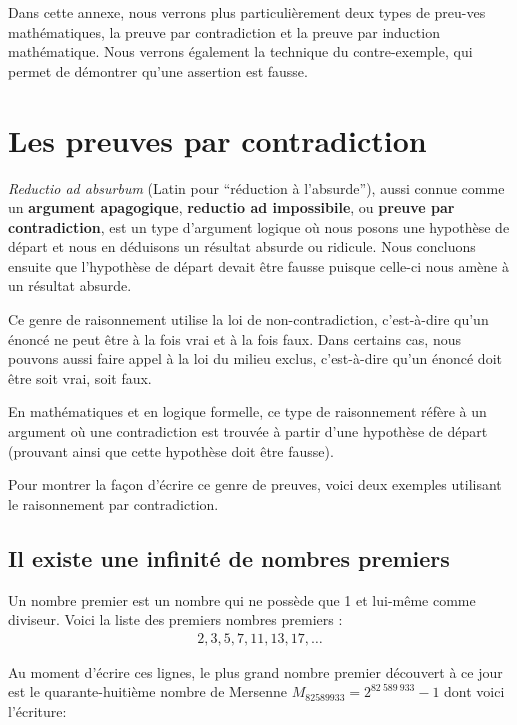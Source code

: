 \documentclass[]{book}
\theoremstyle{definition}
\theoremstyle{definition}
\theoremstyle{definition}
\theoremstyle{remark}
\begin{document}
Dans cette annexe, nous verrons plus particulièrement deux types de preu-ves mathématiques, la preuve par contradiction et la preuve par induction mathématique. Nous verrons également la technique du contre-exemple, qui permet de démontrer qu'une assertion est fausse.

\hypertarget{les-preuves-par-contradiction}{%
\section{Les preuves par contradiction}\label{les-preuves-par-contradiction}}

\emph{Reductio ad absurbum} (Latin pour ``réduction à l'absurde''), aussi connue comme un \textbf{argument apagogique}, \textbf{reductio ad impossibile}, ou \textbf{preuve par contradiction}, est un type d'argument logique où nous posons une hypothèse de départ et nous en déduisons un résultat absurde ou ridicule. Nous concluons ensuite que l'hypothèse de départ devait être fausse puisque celle-ci nous amène à un résultat absurde.

Ce genre de raisonnement utilise la loi de non-contradiction, c'est-à-dire qu'un énoncé ne peut être à la fois vrai et à la fois faux. Dans certains cas, nous pouvons aussi faire appel à la loi du milieu exclus, c'est-à-dire qu'un énoncé doit être soit vrai, soit faux.

En mathématiques et en logique formelle, ce type de raisonnement réfère à un argument où une contradiction est trouvée à partir d'une hypothèse de départ (prouvant ainsi que cette hypothèse doit être fausse).

Pour montrer la façon d'écrire ce genre de preuves, voici deux exemples utilisant le raisonnement par contradiction.

\hypertarget{il-existe-une-infinituxe9-de-nombres-premiers}{%
\subsection{Il existe une infinité de nombres premiers}\label{il-existe-une-infinituxe9-de-nombres-premiers}}

Un nombre premier est un nombre qui ne possède que 1 et lui-même comme diviseur. Voici la liste des premiers nombres premiers :
\begin{align*}
2,3,5,7,11,13,17,\ldots
\end{align*}

Au moment d'écrire ces lignes, le plus grand nombre premier découvert à ce jour est le quarante-huitième nombre de Mersenne \(M_{82589933}=2^{82\ 589\ 933}-1\) dont voici l'écriture:
\end{document}
